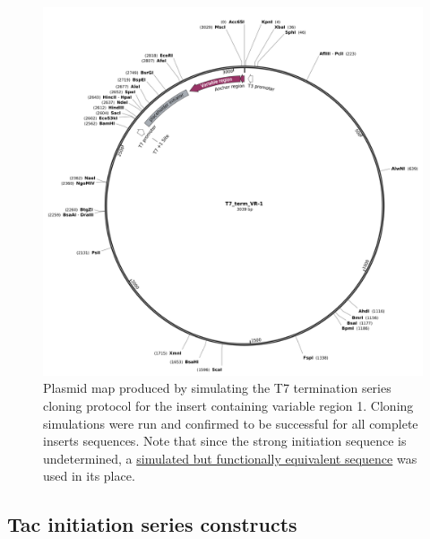 \documentclass[11pt]{article}
\begin{document}
 \begin{figure}[H]
 	\includegraphics[width=12cm]{images/plasmid_maps/T7_term_VR-1 Map.png}
 	\centering
 	\caption{Plasmid map produced by simulating the T7 termination series cloning protocol for the insert containing variable region 1. Cloning simulations were run and confirmed to be successful for all complete inserts sequences. Note that since the strong initiation sequence is undetermined, a  \href{https://github.com/EthanHolleman/plasmid-VR-design/blob/main/notes/placeholder_strong_initiator.ipynb}{simulated but functionally equivalent sequence} was used in its place.}
 	\label{clone:T7-term-insert-simulated}
 \end{figure}
 

\subsection{Tac initiation series constructs}
\label{sec:tac-init}
\end{document}
